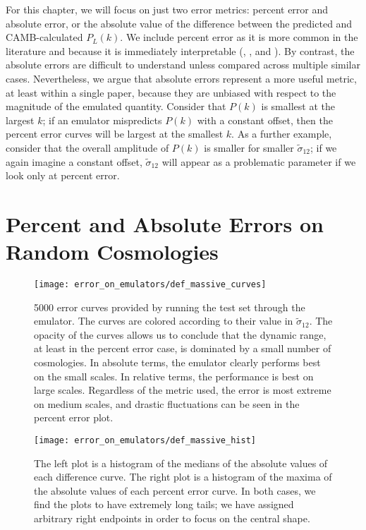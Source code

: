 For this chapter, we will focus
on just two error metrics: percent error and absolute error, or the absolute
value of the difference between the predicted and CAMB-calculated $P_L(k)$. We include percent
error as it is more common in the literature and because it is immediately
interpretable (\citealp{Mancini}, \citealp{Arico}, and
\citealp{Eggemeier}). By contrast, the absolute errors are difficult to
understand unless compared across multiple similar cases.
Nevertheless, we argue
that absolute errors represent a more useful metric, at least within a single
paper, because they are unbiased with respect to the magnitude of the emulated
quantity. Consider that $P(k)$ is smallest at the largest $k$; if an emulator
mispredicts $P(k)$ with a constant offset, then the percent error curves will
be largest at the smallest $k$. As a further example, consider that the
overall amplitude of $P(k)$ is smaller for smaller $\tilde{\sigma}_{12}$;
if we again imagine a constant offset, $\tilde{\sigma}_{12}$ will appear as a
problematic parameter if we look only at percent error.


\section{Percent and Absolute Errors on Random Cosmologies}

\begin{figure}[ht!]
  \centering
  \texttt{[image: error\_on\_emulators/def\_massive\_curves]}
  \caption[Default Massive Emulator Error Curves]{5000 error curves provided 
  by running the test set through the emulator. The curves are colored
  according to their value in $\tilde{\sigma}_{12}$. The opacity of the curves
  allows us to conclude that the dynamic range, at least in the percent
  error case, is dominated by a small number of cosmologies.
  In absolute terms, the emulator
  clearly performs best on the small scales. In relative terms, the
  performance is best on large scales. Regardless of the metric used, the
  error is most extreme on medium scales, and drastic fluctuations can be seen 
  in the percent error plot.}
  \label{fig: def_massive_curves}
\end{figure}

\begin{figure}[ht!]
  \centering
  \texttt{[image: error\_on\_emulators/def\_massive\_hist]}
  \caption[Default Massive Emulator Error Histograms]{The left plot is a
    histogram of the medians of the absolute values of each difference curve.
    The right plot is a histogram of the maxima of the absolute values of
    each percent error curve. In both cases, we find the plots to have
    extremely long tails; we have assigned arbitrary right endpoints
    in order to focus on the central shape.}
  \label{fig: def_massive_hist}
\end{figure}

